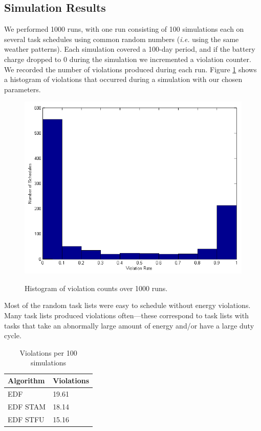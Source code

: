 \subsection{Simulation Results}
We performed 1000 runs, with one run consisting of 100 simulations each on several task schedules using common random numbers (\emph{i.e.} using the same weather patterns).  Each simulation covered a 100-day period, and if the battery charge dropped to 0 during the simulation we incremented a violation counter.  We recorded the number of violations produced during each run.  Figure \ref{fig:violationhist} shows a histogram of violations that occurred during a simulation with our chosen parameters.
\begin{figure}[h]
\includegraphics[scale=0.5]{violationhistogram.png}
\label{fig:violationhist}
\caption{Histogram of violation counts over 1000 runs.}
\end{figure}
Most of the random task lists were easy to schedule without energy violations.  Many task lists produced violations often---these correspond to task lists with tasks that take an abnormally large amount of energy and/or have a large duty cycle.
\begin{table}[h]
\begin{center}
\begin{tabular}{| l | l |}
\hline
\textbf{Algorithm} & \textbf{Violations} \\
\hline
EDF & 19.61 \\
EDF \textsc{STAM} & 18.14 \\		%
EDF \textsc{STFU} & 15.16 \\
\hline
\end{tabular}
\end{center}
\label{tab:simresults}
\caption{Violations per 100 simulations}
\end{table}
